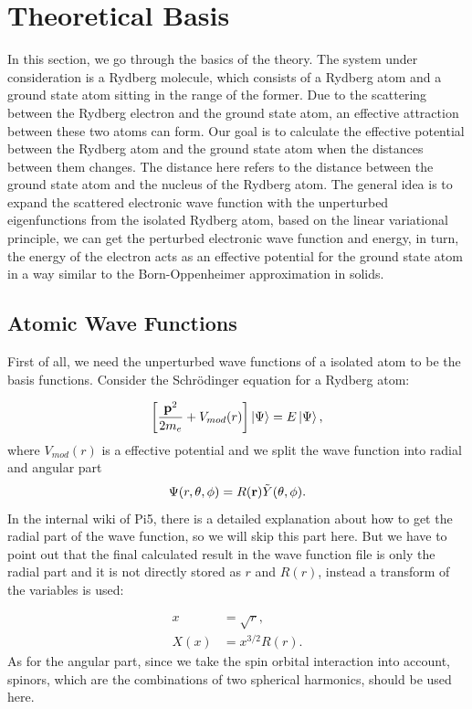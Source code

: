\documentclass[british,english]{article}
\numberwithin{equation}{section}
\numberwithin{figure}{section}
\begin{document}
\section{Theoretical Basis}

In this section, we go through the basics of the theory. The system
under consideration is a Rydberg molecule, which consists of a Rydberg
atom and a ground state atom sitting in the range of the former. Due
to the scattering between the Rydberg electron and the ground state
atom, an effective attraction between these two atoms can form. Our
goal is to calculate the effective potential between the Rydberg atom
and the ground state atom when the distances between them changes.
The distance here refers to the distance between the ground state
atom and the nucleus of the Rydberg atom. The general idea is to expand
the scattered electronic wave function with the unperturbed eigenfunctions
from the isolated Rydberg atom, based on the linear variational principle,
we can get the perturbed electronic wave function and energy, in turn,
the energy of the electron acts as an effective potential for the
ground state atom in a way similar to the Born-Oppenheimer approximation
in solids. 

\subsection{Atomic Wave Functions}

First of all, we need the unperturbed wave functions of a isolated
atom to be the basis functions. Consider the Schr\"odinger equation
for a Rydberg atom: 

\begin{equation}
\left[\frac{{\bf p}^{2}}{2m_{e}}+V_{mod}(r)\right]\Ket{\Psi}=E\Ket{\Psi},
\end{equation}
where $V_{mod}(r)$ is a effective potential and we split the wave
function into radial and angular part
\begin{equation}
\Psi(r,\theta,\phi)=R({\bf r})\tilde{Y}(\theta,\phi).
\label{equ:wavefun}
\end{equation}
In the internal wiki of Pi5, there is a detailed explanation about
how to get the radial part of the wave function, so we will skip this
part here. But we have to point out that the final calculated result
in the wave function file is only the radial part and it is not directly
stored as $r$ and $R(r)$, instead a transform of the variables is
used:

\begin{equation}
\begin{aligned}
x&=\sqrt{r},\\
X(x)&=x^{3/2}R(r).
\label{equ:trans}
\end{aligned}
\end{equation}As for the angular part, since we take the spin orbital interaction
into account, spinors, which are the combinations of two spherical
harmonics, should be used here.
\end{document}
